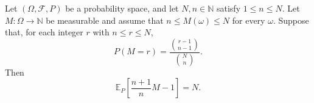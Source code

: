 \begin{theorem}
Let $(\Omega,\mathcal F,P)$ be a probability space, and let $N,n\in\mathbb N$
satisfy $1\leq n\leq N$. Let $M:\Omega\to\mathbb N$ be measurable and
assume that $n\leq M(\omega)\leq N$ for every $\omega$. Suppose that, for
each integer $r$ with $n\leq r\leq N$,
\[
 P(M=r)=\frac{{r-1\choose n-1}}{{N\choose n}}.
\]
Then
\[
 \mathbb E_P\!\left[\frac{n+1}{n}M-1\right]=N.
\]
\end{theorem}
